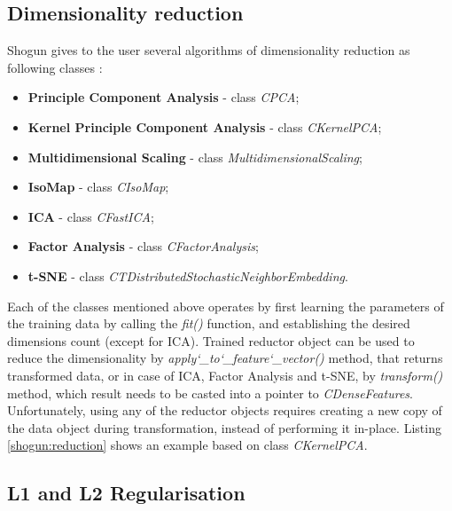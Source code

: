 
\subsection{Dimensionality reduction}

Shogun gives to the user several algorithms of dimensionality reduction as following classes \cite{handsOnMachineLearning}:

\begin{itemize}
	\item \textbf{Principle Component Analysis} - class \textit{CPCA};
	\item \textbf{Kernel Principle Component Analysis} - class \textit{CKernelPCA};
	\item \textbf{Multidimensional Scaling} - class \textit{MultidimensionalScaling};
	\item \textbf{IsoMap} - class \textit{CIsoMap};
	\item \textbf{ICA} - class \textit{CFastICA};
	\item \textbf{Factor Analysis} - class \textit{CFactorAnalysis};
	\item \textbf{t-SNE} - class \textit{CTDistributedStochasticNeighborEmbedding}.
\end{itemize}

Each of the classes mentioned above operates by first learning the parameters of the training data by calling the \textit{fit()} function, and establishing the desired dimensions count (except for ICA). Trained reductor object can be used to reduce the dimensionality by \textit{apply\char`_to\char`_feature\char`_vector()} method, that returns transformed data, or in case of ICA, Factor Analysis and t-SNE, by \textit{transform()} method, which result needs to be casted into a pointer to \textit{CDenseFeatures}. Unfortunately, using any of the reductor objects requires creating a new copy of the data object during transformation, instead of performing it in-place. Listing \ref{shogun:reduction} shows an example based on class \textit{CKernelPCA}.


\subsection{L1 and L2 Regularisation}

